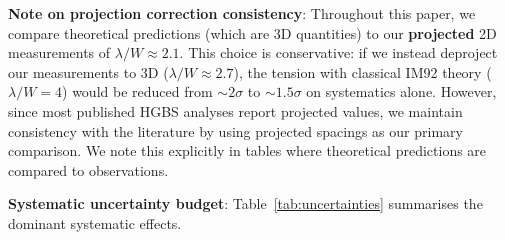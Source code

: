 \documentclass[11pt,a4paper]{article}
\begin{document}
\textbf{Note on projection correction consistency}: Throughout this paper, we compare theoretical predictions (which are 3D quantities) to our \textbf{projected} 2D measurements of $\lambda/W \approx 2.1$. This choice is conservative: if we instead deproject our measurements to 3D ($\lambda/W \approx 2.7$), the tension with classical IM92 theory ($\lambda/W = 4$) would be reduced from $\sim2\sigma$ to $\sim1.5\sigma$ on systematics alone. However, since most published HGBS analyses report projected values, we maintain consistency with the literature by using projected spacings as our primary comparison. We note this explicitly in tables where theoretical predictions are compared to observations.

\textbf{Systematic uncertainty budget}: Table~\ref{tab:uncertainties} summarises the dominant systematic effects.
\end{document}
